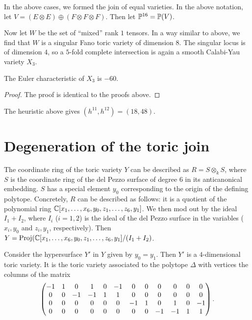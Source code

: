 In the above cases, we formed the join of equal varieties. In the above notation, let $V=(E \otimes E) \oplus (F \otimes F \otimes F)$. Then let $\P^{16}=\P(V)$.

Now let $W$ be the set of ``mixed'' rank $1$ tensors. In a way similar to above, we find that $W$ is a singular Fano toric variety of dimension $8$. The singular locus is of dimension $4$, so a $5$-fold complete intersection is again a smooth Calabi-Yau variety $X_3$.

\begin{proposition}
The Euler characteristic of $X_3$ is $-60$.
\end{proposition}
\begin{proof}
The proof is identical to the proofs above.
\end{proof}

\begin{remark}
The heuristic above gives $(h^{11},h^{12})=(18,48)$. 
\end{remark}



\section{Degeneration of the toric join}

The coordinate ring of the toric variety $Y$ can be described as $R = S \otimes_k S$, where $S$ is the coordinate ring of the del Pezzo surface of degree $6$ in its anticanonical embedding. $S$ has a special element $y_0$ corresponding to the origin of the defining polytope. Concretely, $R$ can be described as follows: it is a quotient of the polynomial ring $\C[x_1,\ldots,x_6,y_0,z_1,\ldots,z_6,y_1]$. We then mod out by the ideal $I_1 + I_2$, where $I_i$ ($i=1,2$) is the ideal of the del Pezzo surface in the variables ($x_i,y_0$ and $z_i,y_1$, respectively). Then $Y=\Proj(\C[x_1,\ldots,x_6,y_0,z_1,\ldots,z_6,y_1]/(I_1+I_2)$.

Consider the hypersurface $Y'$ in $Y$ given by $y_0=y_1$. Then $Y'$ is a $4$-dimensional toric variety. It is the toric variety associated to the polytope $\Delta$ with vertices the columns of the matrix
\[
 \makeatletter\c@MaxMatrixCols=12\makeatother\begin{pmatrix}{-1}&
      1&
      0&
      1&
      0&
      {-1}&
      0&
      0&
      0&
      0&
      0&
      0\\
      0&
      0&
      {-1}&
      {-1}&
      1&
      1&
      0&
      0&
      0&
      0&
      0&
      0\\
      0&
      0&
      0&
      0&
      0&
      0&
      {-1}&
      1&
      0&
      1&
      0&
      {-1}\\
      0&
      0&
      0&
      0&
      0&
      0&
      0&
      0&
      {-1}&
      {-1}&
      1&
      1\\
      \end{pmatrix}.
\]

